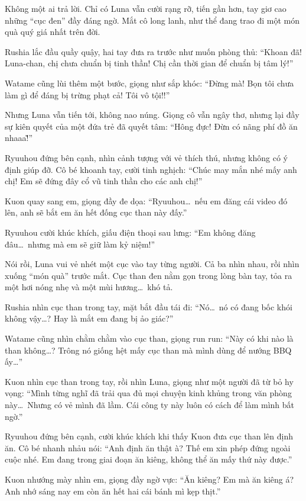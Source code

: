 \documentclass[../main.tex]{subfiles}
\begin{document}
Không một ai trả lời. Chỉ có Luna vẫn cười rạng rỡ, tiến gần hơn, tay giơ cao những ``cục đen'' đầy đáng ngờ. Mắt cô long lanh, như thể đang trao đi một món quà quý giá nhất trên đời.

Rushia lắc đầu quầy quậy, hai tay đưa ra trước như muốn phòng thủ: ``Khoan đã! Luna-chan, chị chưa chuẩn bị tinh thần! Chị cần thời gian để chuẩn bị tâm lý!''

Watame cũng lùi thêm một bước, giọng như sắp khóc: ``Đừng mà! Bọn tôi chưa làm gì để đáng bị trừng phạt cả! Tôi vô tội!!''

Nhưng Luna vẫn tiến tới, không nao núng. Giọng cô vẫn ngây thơ, nhưng lại đầy sự kiên quyết của một đứa trẻ đã quyết tâm: ``Hông đực! Đừn có nãng phí đồ ăn nhaaa\~!''

Ryuuhou đứng bên cạnh, nhìn cảnh tượng với vẻ thích thú, nhưng không có ý định giúp đỡ. Cô bé khoanh tay, cười tinh nghịch: ``Chúc may mắn nhé mấy anh chị! Em sẽ đứng đây cổ vũ tinh thần cho các anh chị!''

Kuon quay sang em, giọng đầy đe dọa: ``Ryuuhou\dots\ nếu em đăng cái video đó lên, anh sẽ bắt em ăn hết đống cục than này đấy.''

Ryuuhou cười khúc khích, giấu điện thoại sau lưng: ``Em không đăng đâu\dots\ nhưng mà em sẽ giữ làm kỷ niệm!''

Nói rồi, Luna vui vẻ nhét một cục vào tay từng người. Cả ba nhìn nhau, rồi nhìn xuống ``món quà'' trước mắt. Cục than đen nằm gọn trong lòng bàn tay, tỏa ra một hơi nóng nhẹ và một mùi hương\dots\ khó tả.

Rushia nhìn cục than trong tay, mặt bắt đầu tái đi: ``Nó\dots\ nó có đang bốc khói không vậy\dots? Hay là mắt em đang bị ảo giác?''

Watame cũng nhìn chằm chằm vào cục than, giọng run run: ``Này có khi nào là than không\dots? Trông nó giống hệt mấy cục than mà mình dùng để nướng BBQ ấy\dots''

Kuon nhìn cục than trong tay, rồi nhìn Luna, giọng như một người đã từ bỏ hy vọng: ``Mình từng nghĩ đã trải qua đủ mọi chuyện kinh khủng trong văn phòng này\dots\ Nhưng có vẻ mình đã lầm. Cái công ty này luôn có cách để làm mình bất ngờ.''

Ryuuhou đứng bên cạnh, cười khúc khích khi thấy Kuon đưa cục than lên định ăn. Cô bé nhanh nhảu nói: ``Anh định ăn thật à? Thế em xin phép đứng ngoài cuộc nhé. Em đang trong giai đoạn ăn kiêng, không thể ăn mấy thứ này được.''

Kuon nhướng mày nhìn em, giọng đầy ngờ vực: ``Ăn kiêng? Em mà ăn kiêng á? Anh nhớ sáng nay em còn ăn hết hai cái bánh mì kẹp thịt.''
\end{document}
